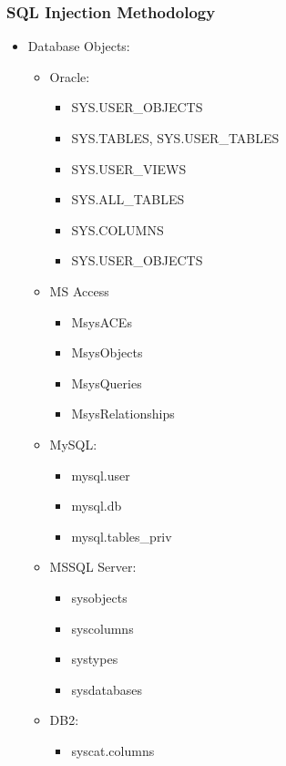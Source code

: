 \subsubsection{SQL Injection Methodology}
\begin{itemize}
    \item Database Objects:
    \begin{itemize}
        \item Oracle:
        \begin{itemize}
            \item SYS.USER\_OBJECTS
            \item SYS.TABLES, SYS.USER\_TABLES
            \item SYS.USER\_VIEWS
            \item SYS.ALL\_TABLES
            \item SYS.COLUMNS
            \item SYS.USER\_OBJECTS
        \end{itemize}
        \item MS Access
        \begin{itemize}
            \item MsysACEs
            \item MsysObjects
            \item MsysQueries
            \item MsysRelationships
        \end{itemize}
        \item MySQL:
        \begin{itemize}
            \item mysql.user
            \item mysql.db
            \item mysql.tables\_priv
        \end{itemize}
        \item MSSQL Server:
        \begin{itemize}
            \item sysobjects
            \item syscolumns
            \item systypes
            \item sysdatabases
        \end{itemize}
        \item DB2:
        \begin{itemize}
            \item syscat.columns
        \end{itemize}

\end{itemize}
\end{itemize}
